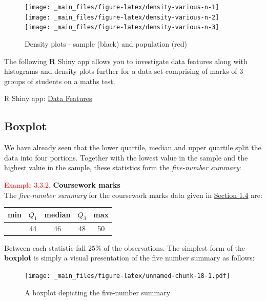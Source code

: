 \documentclass[
]{book}
\begin{document}
\begin{figure}
\texttt{[image: \_main\_files/figure-latex/density-various-n-1]} \texttt{[image: \_main\_files/figure-latex/density-various-n-2]} \texttt{[image: \_main\_files/figure-latex/density-various-n-3]} \caption{Density plots - sample (black) and population (red)}\label{fig:density-various-n}
\end{figure}

The following \textbf{R} Shiny app allows you to investigate data features along with histograms and density plots further for a data set comprising of marks of 3 groups of students on a maths test.

R Shiny app: \href{https://shiny-new.maths.nottingham.ac.uk/pmzpn/DataFeatures/}{Data Features}

\hypertarget{visual_plot_boxplot}{%
\subsection{\texorpdfstring{{\textbf{Boxplot}}}{Boxplot}}\label{visual_plot_boxplot}}

We have already seen that the lower quartile, median and upper quartile
split the data into four portions. Together with the lowest value in the
sample and the highest value in the sample, these statistics form the
\emph{five-number summary}:

\leavevmode{}%
\textcolor{red}{Example 3.3.2.}
{ \textbf{Coursework marks} }\\
The \emph{five-number summary} for the coursework marks data given in \protect\hyperlink{intro_example}{Section 1.4} are:

\begin{longtable}[]{@{}ccccc@{}}
\toprule\noalign{}
min & \(Q_1\) & median & \(Q_3\) & max \\
\midrule\noalign{}
\endhead
\bottomrule\noalign{}
\endlastfoot
34 & 44 & 46 & 48 & 50 \\
\end{longtable}

Between each statistic fall 25\% of the observations. The simplest form
of the \textbf{boxplot} is simply a visual presentation of the five number
summary as follows:

\begin{figure}
\centering
\texttt{[image: \_main\_files/figure-latex/unnamed-chunk-18-1.pdf]}
\caption{\label{fig:unnamed-chunk-18}A boxplot depicting the five-number summary}
\end{figure}
\end{document}
